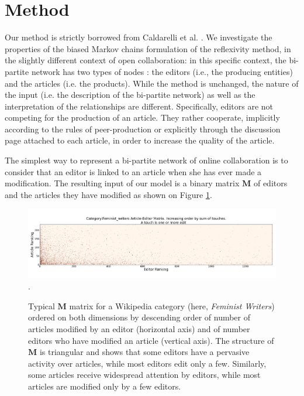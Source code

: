 \section{Method}
Our method is strictly borrowed from Caldarelli et al. \cite{caldarelli2012network}. We investigate the properties of the biased Markov chains formulation of the reflexivity method, in the slightly different context of open collaboration: in this specific context, the bi-partite network has two types of nodes : the editors (i.e., the producing entities) and the articles (i.e. the products). While the method is unchanged, the nature of the input (i.e. the description of the bi-partite network) as well as the interpretation of the relationships are different. Specifically, editors are not competing for the production of an article. They rather cooperate, implicitly according to the rules of peer-production or explicitly through the discussion page attached to each article, in order to increase the quality of the article.

The simplest way to represent a bi-partite network of online collaboration is to consider that an editor is linked to an article when she has ever made a modification. The resulting input of our model is a binary matrix $\mathbf{M}$ of editors and the articles they have modified as shown on Figure \ref{fig:matrix}. 

\begin{figure}[!t]
\centering
\includegraphics[width=2.0\columnwidth]{Figures/Category_Feminist_writerstriangle_matrix_corrected.png}.
\caption{Typical $\mathbf{M}$ matrix for a Wikipedia category (here, {\it Feminist Writers}) ordered on both dimensions by descending order of number of articles modified by an editor (horizontal axis) and of number editors who have modified an article (vertical axis). The structure of $\mathbf{M}$ is triangular and shows that some editors have a pervasive activity over articles, while most editors edit only a few. Similarly, some articles receive widespread attention by editors, while most articles are modified only by a few editors.}
\label{fig:matrix}
\end{figure}


